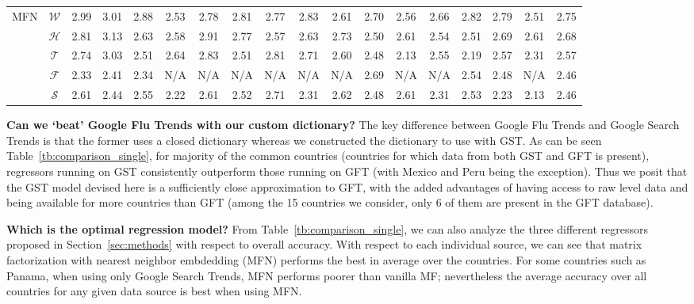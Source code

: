 \begin{table}
\begin{tabular}{|*{18}{c|}}
\hline
\multirow{5}{*}{MFN}& $\mathcal{W}$ &2.99&3.01&2.88&2.53&2.78&2.81&2.77&2.83&2.61&2.70&2.56&2.66&2.82&2.79&2.51&2.75\\ 
                    & $\mathcal{H}$ &2.81&3.13&2.63&2.58&2.91&2.77&2.57&2.63&2.73&2.50&2.61&2.54&2.51&2.69&2.61&2.68\\ 
                    & $\mathcal{T}$ &2.74&3.03&2.51&2.64&2.83&2.51&2.81&2.71&2.60&2.48&2.13&2.55&2.19&2.57&2.31&2.57\\ 
                    & $\mathcal{F}$ &2.33&2.41&2.34& N/A& N/A& N/A& N/A& N/A& N/A&2.69& N/A& N/A&2.54&2.48& N/A&2.46\\ 
                    & $\mathcal{S}$ &2.61&2.44&2.55&2.22&2.61&2.52&2.71&2.31&2.62&2.48&2.61&2.31&2.53&2.23&2.13&2.46\\ 
\hline
\end{tabular}
\end{table}


{\noindent \textbf{Can we `beat' Google Flu Trends with our custom dictionary?}}  
The key difference between Google Flu Trends and Google Search Trends is that the former uses a closed dictionary whereas
we constructed the dictionary to use with GST.
As can be seen Table~\ref{tb:comparison_single},
for majority of the common countries (countries for which data from both GST and GFT
is present), regressors running on GST consistently 
outperform those running on GFT (with Mexico and Peru being the exception).
Thus we posit that the GST model devised here is a sufficiently close approximation to GFT, 
with the added advantages of having access to raw level data and being available for more countries 
than GFT (among the 15 countries we consider, only 6 of them are present in the GFT database).

{\noindent \textbf{Which is the optimal regression model?}} From Table~\ref{tb:comparison_single}, we can also
analyze the three different regressors proposed in Section~\ref{sec:methods} with respect to overall accuracy.
With respect to each individual source, we can see that matrix factorization with nearest 
neighbor embdedding (MFN) performs the best in average over the countries.
For some countries such as Panama, when using only Google Search Trends, MFN
performs poorer than vanilla MF; nevertheless the average accuracy over all countries for any given
data source is best when using MFN.

